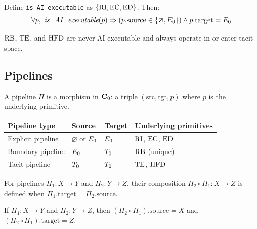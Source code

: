 \begin{theorem}
Define \texttt{is\_AI\_executable} as $\{\mathrm{RI}, \mathrm{EC}, \mathrm{ED}\}$. Then:
\[
  \forall p,\
  \textit{is\_AI\_executable}(p)
  \Rightarrow (p.\mathrm{source} \in \{\varnothing, E_0\})
              \wedge p.\mathrm{target} = E_0
\]
\end{theorem}

\begin{corollary}
$\mathrm{RB}$, $\mathrm{TE}$, and $\mathrm{HFD}$ are never AI-executable and always operate in or
enter tacit space.
\end{corollary}

\subsection{Pipelines}

\begin{definition}[Pipeline]
A pipeline $\Pi$ is a morphism in $\mathbf{C}_0$: a triple $(\mathrm{src},
\mathrm{tgt}, p)$ where $p$ is the underlying primitive.
\end{definition}

\begin{center}
\begin{tabular}{llll}
\toprule
Pipeline type & Source & Target & Underlying primitives \\
\midrule
Explicit pipeline & $\varnothing$ or $E_0$ & $E_0$ & $\mathrm{RI}$, $\mathrm{EC}$, $\mathrm{ED}$ \\
Boundary pipeline & $E_0$ & $T_0$ & $\mathrm{RB}$ (unique) \\
Tacit pipeline & $T_0$ & $T_0$ & $\mathrm{TE}$, $\mathrm{HFD}$ \\
\bottomrule
\end{tabular}
\end{center}

\begin{definition}
For pipelines $\Pi_1 : X \to Y$ and $\Pi_2 : Y \to Z$, their composition
$\Pi_2 \circ \Pi_1 : X \to Z$ is defined when
$\Pi_1.\mathrm{target} = \Pi_2.\mathrm{source}$.
\end{definition}

\begin{theorem}
If $\Pi_1 : X \to Y$ and $\Pi_2 : Y \to Z$, then
$(\Pi_2 \circ \Pi_1).\mathrm{source} = X$ and
$(\Pi_2 \circ \Pi_1).\mathrm{target} = Z$.
\end{theorem}

